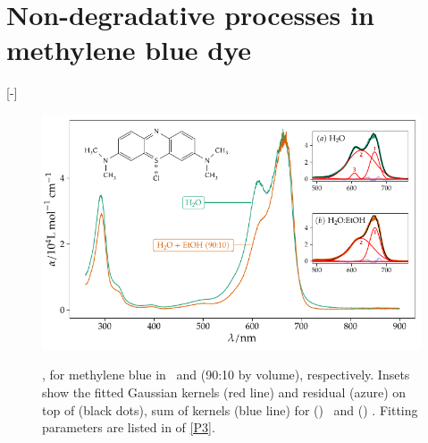 \documentclass[draft,webedition,openright,titles,swedish,english]{LuaUUThesis}\usepackage[]{graphicx}\usepackage[]{xcolor}
\newenvironment{knitrout}{}{} %
\begin{document}
%

% 

\section{Non-degradative processes in methylene blue dye}
\label{results:P12-methylene-blue}
[-\baselineskip]


%

\begin{figure}[tbp]
\centering
\begin{knitrout}\scriptsize
{}\color{fgcolor}

{\centering \includegraphics[width=4.72in]{figure/0512P-fig-MB-abs-water-ethanol-1} 

}


\end{knitrout}
{\label{fig-a:P12-MB-abs}}
{\label{fig-b:P12-MB-abs}}
\caption[Methylene blue in \water\ and in \water:\EtOH\ solutions]{%
   \protect{}, for methylene blue in \water\ and
    (90:10 by volume), respectively.
   Insets show the fitted Gaussian kernels (red line) and residual (azure) on top of
   \protect{} (black dots), sum of kernels (blue line) for
   () \water\ and
   () .
   Fitting parameters are listed in \supplemental[short] of \protect\cref{P3}.}
\label{fig:P12-MB-abs}
\end{figure}
\end{document}
